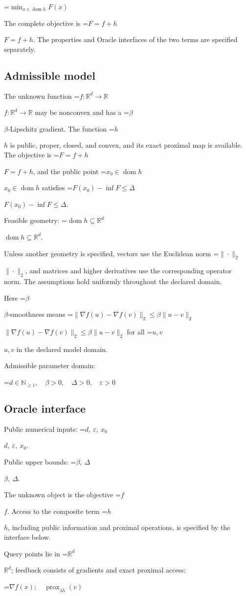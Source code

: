 \documentclass[10pt,a4paper]{article}
\newcommand{\AtlasMath}[1]{\par\begingroup\centering\setbox0=\hbox{$\displaystyle #1$}\ifdim\wd0>1.4\linewidth\typeout{ATLAS WIDE FORMULA: \the\wd0}\fi\ifdim\wd0>\linewidth\resizebox{\linewidth}{!}{\box0}\else\box0\fi\par\endgroup}
\newcommand{\AtlasInlineMath}[1]{\begingroup\setbox0=\hbox{$#1$}\ifdim\wd0>.4\linewidth\endgroup\AtlasMath{#1}\else\endgroup$#1$\fi}
\begin{document}
\AtlasMath{\min_{x\in \operatorname{dom}h}F(x)}


The complete objective is \AtlasInlineMath{F=f+h}. The properties and Oracle interfaces of the two terms are specified separately.

\subsection{Admissible model}
The unknown function \AtlasInlineMath{f:\mathbb R^d\to\mathbb R} may be nonconvex and has a \AtlasInlineMath{\beta}-Lipschitz gradient. The function \AtlasInlineMath{h} is public, proper, closed, and convex, and its exact proximal map is available. The objective is \AtlasInlineMath{F=f+h}, and the public point \AtlasInlineMath{x_0\in\operatorname{dom}h} satisfies \AtlasInlineMath{F(x_0)-\inf F\le\Delta}.

Feasible geometry: \AtlasInlineMath{\operatorname{dom}h\subseteq\mathbb{R}^d}.

Unless another geometry is specified, vectors use the Euclidean norm \AtlasInlineMath{\|\cdot\|_2}, and matrices and higher derivatives use the corresponding operator norm. The assumptions hold uniformly throughout the declared domain.

Here \AtlasInlineMath{\beta}-smoothness means \AtlasInlineMath{\|\nabla f(u)-\nabla f(v)\|_2\le\beta\|u-v\|_2} for all \AtlasInlineMath{u,v} in the declared model domain.

Admissible parameter domain:


\AtlasMath{d\in\mathbb{N}_{\ge1},\quad \beta>0,\quad \Delta>0,\quad \varepsilon>0}


\subsection{Oracle interface}
Public numerical inputs: \AtlasInlineMath{d,\ \varepsilon,\ x_0}.

Public upper bounds: \AtlasInlineMath{\beta,\ \Delta}.

The unknown object is the objective \AtlasInlineMath{f}. Access to the composite term \AtlasInlineMath{h}, including public information and proximal operations, is specified by the interface below.

Query points lie in \AtlasInlineMath{\mathbb{R}^d}; feedback consists of gradients and exact proximal access:


\AtlasMath{\nabla f(x);\quad\operatorname{prox}_{\lambda h}(v)}
\end{document}
